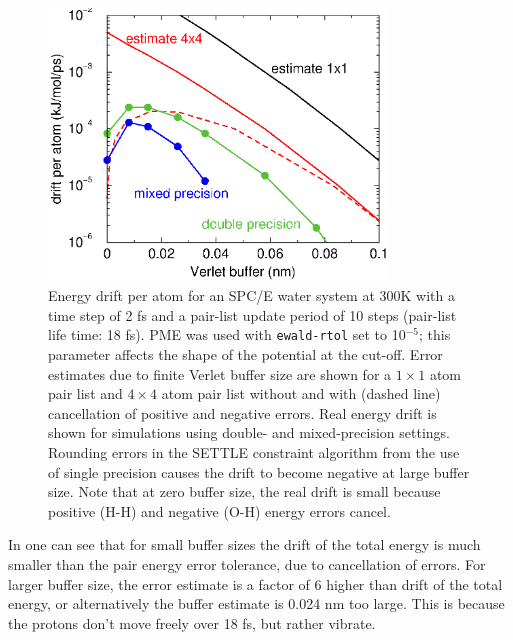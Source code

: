 {\begin{figure}
\centerline{\includegraphics[width=9cm]{plots/verlet-drift}}
\caption {Energy drift per atom for an SPC/E water system at 300K with
  a time step of 2 fs and a pair-list update period of 10 steps
  (pair-list life time: 18 fs). PME was used with {\tt ewald-rtol} set
  to 10$^{-5}$; this parameter affects the shape of the potential at
  the cut-off. Error estimates due to finite Verlet buffer size are
  shown for a $1 \times 1$ atom pair list and $4 \times 4$ atom pair
  list without and with (dashed line) cancellation of positive and
  negative errors. Real energy drift is shown for simulations using
  double- and mixed-precision settings. Rounding errors in the SETTLE
  constraint algorithm from the use of single precision causes
  the drift to become negative
  at large buffer size. Note that at zero buffer size, the real drift
  is small because positive (H-H) and negative (O-H) energy errors
  cancel.}
\label{fig:verletdrift}
\end{figure}

In  one can see that for small buffer sizes the drift
of the total energy is much smaller than the pair energy error tolerance,
due to cancellation of errors. For larger buffer size, the error estimate
is a factor of 6 higher than drift of the total energy, or alternatively
the buffer estimate is 0.024 nm too large. This is because the protons
don't move freely over 18 fs, but rather vibrate.

}
